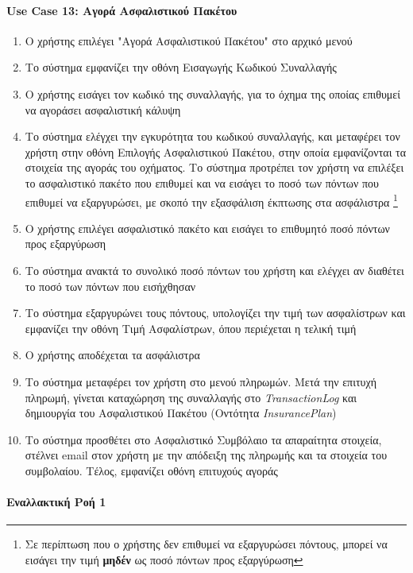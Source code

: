 \documentclass{../ol-softwaremanual}
\begin{document}
	\paragraph{\en Use Case 13: \gr Αγορά Ασφαλιστικού Πακέτου}
	\begin{enumerate}
		\item Ο χρήστης επιλέγει \en"\gr Αγορά Ασφαλιστικού Πακέτου\en" \gr στο αρχικό μενού
		\item Το σύστημα εμφανίζει την οθόνη Εισαγωγής Κωδικού Συναλλαγής
		\item Ο χρήστης εισάγει τον κωδικό της συναλλαγής, για το όχημα της οποίας επιθυμεί να αγοράσει ασφαλιστική κάλυψη
		\item Το σύστημα ελέγχει την εγκυρότητα του κωδικού συναλλαγής, και μεταφέρει τον χρήστη στην οθόνη Επιλογής Ασφαλιστικού Πακέτου, στην οποία εμφανίζονται τα στοιχεία της αγοράς του οχήματος. Το σύστημα προτρέπει τον χρήστη να επιλέξει το ασφαλιστικό πακέτο που επιθυμεί και να εισάγει το ποσό των πόντων που επιθυμεί να εξαργυρώσει, με σκοπό την εξασφάλιση έκπτωσης στα ασφάλιστρα \footnote[3]{Σε περίπτωση που ο χρήστης δεν επιθυμεί να εξαργυρώσει πόντους, μπορεί να εισάγει την τιμή \textbf{μηδέν} ως ποσό πόντων προς εξαργύρωση}
		\item Ο χρήστης επιλέγει ασφαλιστικό πακέτο και εισάγει το επιθυμητό ποσό πόντων προς εξαργύρωση
		\item Το σύστημα ανακτά το συνολικό ποσό πόντων του χρήστη και	ελέγχει αν διαθέτει το ποσό των πόντων που εισήχθησαν
		\item Το σύστημα εξαργυρώνει τους πόντους, υπολογίζει την τιμή των ασφαλίστρων και εμφανίζει την οθόνη Τιμή Ασφαλίστρων, όπου περιέχεται η τελική τιμή 
		\item Ο χρήστης αποδέχεται τα ασφάλιστρα
		\item Το σύστημα μεταφέρει τον χρήστη στο μενού πληρωμών. Μετά την επιτυχή πληρωμή, γίνεται καταχώρηση της συναλλαγής στο \en \textit{TransactionLog} \gr και δημιουργία του Ασφαλιστικού Πακέτου (Οντότητα \en \textit{InsurancePlan}\gr)
		\item Το σύστημα προσθέτει στο Ασφαλιστικό Συμβόλαιο τα απαραίτητα στοιχεία, στέλνει \en email \gr στον χρήστη με την απόδειξη της πληρωμής και τα στοιχεία του συμβολαίου. Τέλος, εμφανίζει οθόνη επιτυχούς αγοράς	
	\end{enumerate}
	
	\paragraph{Εναλλακτική Ροή 1 }
	
\end{document}
